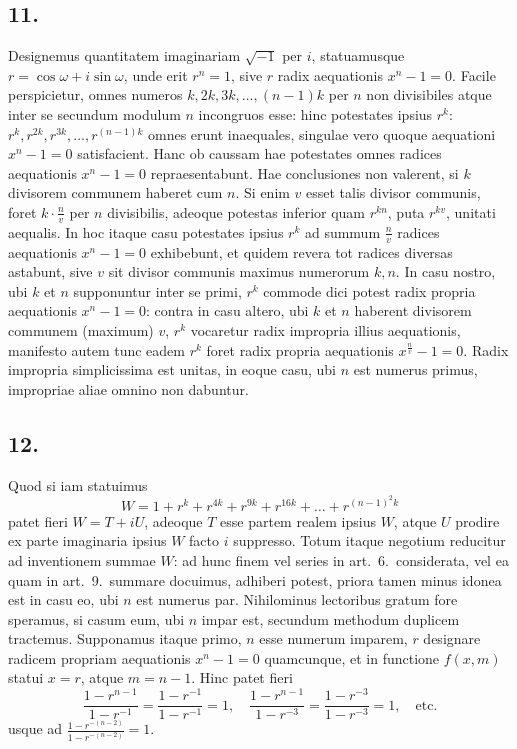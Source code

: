 \documentclass[12pt,a4paper]{article}
\theoremstyle{plain}
\begin{document}
\subsection*{11.}

Designemus quantitatem imaginariam $\sqrt{-1}$ per $i$, statuamusque $r = \cos \omega + i\sin \omega$, unde erit $r^n = 1$, sive $r$ radix aequationis $x^n - 1 = 0$. Facile perspicietur, omnes numeros $k, 2k, 3k, \ldots, (n-1)k$ per $n$ non divisibiles atque inter se secundum modulum $n$ incongruos esse: hinc potestates ipsius $r^{k}$: $r^k, r^{2k}, r^{3k}, \ldots, r^{(n-1)k}$ omnes erunt inaequales, singulae vero quoque aequationi $x^n - 1 = 0$ satisfacient. Hanc ob caussam hae potestates omnes radices aequationis $x^n - 1 = 0$ repraesentabunt. Hae conclusiones non valerent, si $k$ divisorem communem haberet cum $n$. Si enim $v$ esset talis divisor communis, foret $k \cdot \frac{n}{v}$ per $n$ divisibilis, adeoque potestas inferior quam $r^{kn}$, puta $r^{kv}$, unitati aequalis. In hoc itaque casu potestates ipsius $r^k$ ad summum $\frac{n}{v}$ radices aequationis $x^n - 1 = 0$ exhibebunt, et quidem revera tot radices diversas astabunt, sive $v$ sit divisor communis maximus numerorum $k, n$. In casu nostro, ubi $k$ et $n$ supponuntur inter se primi, $r^k$ commode dici potest radix propria aequationis $x^n - 1 = 0$: contra in casu altero, ubi $k$ et $n$ haberent divisorem communem (maximum) $v$, $r^k$ vocaretur radix impropria illius aequationis, manifesto autem tunc eadem $r^k$ foret radix propria aequationis $x^{\frac{n}{v}} - 1 = 0$. Radix impropria simplicissima est unitas, in eoque casu, ubi $n$ est numerus primus, impropriae aliae omnino non dabuntur.

\subsection*{12.}

Quod si iam statuimus
\[
W = 1 + r^{k} + r^{4k} + r^{9k} + r^{16k} + \ldots + r^{(n-1)^2 k}
\]
patet fieri $W = T + iU$, adeoque $T$ esse partem realem ipsius $W$, atque $U$ prodire ex parte imaginaria ipsius $W$ facto $i$ suppresso. Totum itaque negotium reducitur ad inventionem summae $W$: ad hunc finem vel series in art.\ 6.\ considerata, vel ea quam in art.\ 9.\ summare docuimus, adhiberi potest, priora tamen minus idonea est in casu eo, ubi $n$ est numerus par. Nihilominus lectoribus gratum fore speramus, si casum eum, ubi $n$ impar est, secundum methodum duplicem tractemus. Supponamus itaque primo, $n$ esse numerum imparem, $r$ designare radicem propriam aequationis $x^n - 1 = 0$ quamcunque, et in functione $f(x, m)$ statui $x = r$, atque $m = n-1$. Hinc patet fieri
\[
\frac{1-r^{n-1}}{1-r^{-1}} = \frac{1-r^{-1}}{1-r^{-1}} = 1, \quad \frac{1-r^{n-1}}{1-r^{-3}} = \frac{1-r^{-3}}{1-r^{-3}} = 1, \quad \text{etc.}
\]
usque ad $\frac{1-r^{-(n-2)}}{1-r^{-(n-2)}} = 1$.
\end{document}

